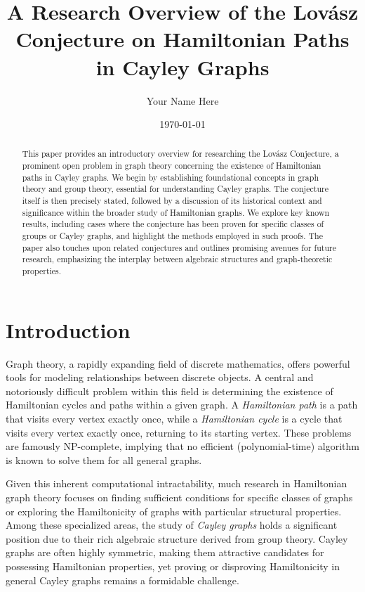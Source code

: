 \documentclass[12pt]{article}
\title{A Research Overview of the Lovász Conjecture on Hamiltonian Paths in Cayley Graphs}
\author{Your Name Here} %
\date{\today}
\theoremstyle{remark}
\begin{document}
\maketitle

\begin{abstract}
This paper provides an introductory overview for researching the Lovász Conjecture, a prominent open problem in graph theory concerning the existence of Hamiltonian paths in Cayley graphs. We begin by establishing foundational concepts in graph theory and group theory, essential for understanding Cayley graphs. The conjecture itself is then precisely stated, followed by a discussion of its historical context and significance within the broader study of Hamiltonian graphs. We explore key known results, including cases where the conjecture has been proven for specific classes of groups or Cayley graphs, and highlight the methods employed in such proofs. The paper also touches upon related conjectures and outlines promising avenues for future research, emphasizing the interplay between algebraic structures and graph-theoretic properties.
\end{abstract}

\clearpage
\tableofcontents
\clearpage

\section{Introduction}
Graph theory, a rapidly expanding field of discrete mathematics, offers powerful tools for modeling relationships between discrete objects. A central and notoriously difficult problem within this field is determining the existence of Hamiltonian cycles and paths within a given graph. A \emph{Hamiltonian path} is a path that visits every vertex exactly once, while a \emph{Hamiltonian cycle} is a cycle that visits every vertex exactly once, returning to its starting vertex. These problems are famously NP-complete, implying that no efficient (polynomial-time) algorithm is known to solve them for all general graphs.

Given this inherent computational intractability, much research in Hamiltonian graph theory focuses on finding sufficient conditions for specific classes of graphs or exploring the Hamiltonicity of graphs with particular structural properties. Among these specialized areas, the study of \emph{Cayley graphs} holds a significant position due to their rich algebraic structure derived from group theory. Cayley graphs are often highly symmetric, making them attractive candidates for possessing Hamiltonian properties, yet proving or disproving Hamiltonicity in general Cayley graphs remains a formidable challenge.
\end{document}
